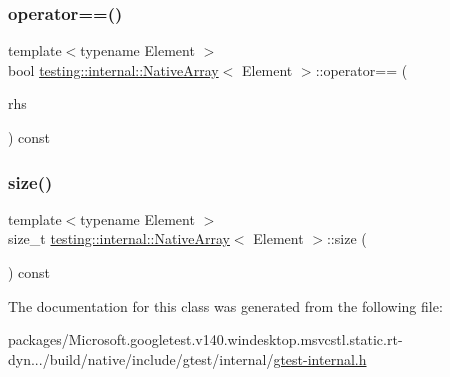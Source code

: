 \mbox{\label{classtesting_1_1internal_1_1_native_array_a81b90f5739ed812610e68dc34c9e3850}} 
\subsubsection{\texorpdfstring{operator==()}{operator==()}}
{\footnotesize\ttfamily template$<$typename Element $>$ \\
bool \mbox{\hyperlink{classtesting_1_1internal_1_1_native_array}{testing\+::internal\+::\+Native\+Array}}$<$ Element $>$\+::operator== (\begin{DoxyParamCaption}\item[{const \mbox{\hyperlink{classtesting_1_1internal_1_1_native_array}{Native\+Array}}$<$ Element $>$ \&}]{rhs }\end{DoxyParamCaption}) const\hspace{0.3cm}{\ttfamily [inline]}}

\mbox{\label{classtesting_1_1internal_1_1_native_array_af96a4a5ca0cdd5d163c47a081f08bd89}} 
\subsubsection{\texorpdfstring{size()}{size()}}
{\footnotesize\ttfamily template$<$typename Element $>$ \\
size\+\_\+t \mbox{\hyperlink{classtesting_1_1internal_1_1_native_array}{testing\+::internal\+::\+Native\+Array}}$<$ Element $>$\+::size (\begin{DoxyParamCaption}{ }\end{DoxyParamCaption}) const\hspace{0.3cm}{\ttfamily [inline]}}



The documentation for this class was generated from the following file\+:\begin{DoxyCompactItemize}
\item 
packages/\+Microsoft.\+googletest.\+v140.\+windesktop.\+msvcstl.\+static.\+rt-\/dyn.../build/native/include/gtest/internal/\mbox{\hyperlink{gtest-internal_8h}{gtest-\/internal.\+h}}\end{DoxyCompactItemize}
